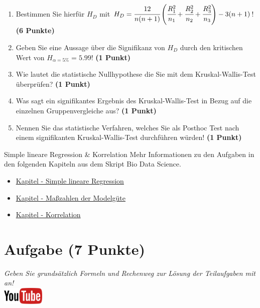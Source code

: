 \documentclass[a4paper, 9pt]{scrartcl}\usepackage[]{graphicx}\usepackage[]{xcolor}
\begin{document}
\begin{enumerate}
\item Bestimmen Sie hierf{\"u}r $H_D$ mit $H_D=
  \cfrac{12}{n(n+1)}\left(\cfrac{R_1^2}{n_1}+\cfrac{R_2^2}{n_2}
    + \cfrac{R_3^2}{n_3}\right)
  - 3(n+1)$! \textbf{(6 Punkte)} 
\item Geben Sie eine Aussage {\"u}ber die Signifikanz von $H_D$ durch
  den kritischen Wert von $H_{\alpha = 5\%} = 5.99$! \textbf{(1 Punkt)}
\item Wie lautet die statistische Nullhypothese die Sie mit dem Kruskal-Wallis-Test
  {\"u}berpr{\"u}fen? \textbf{(1 Punkt)}
\item Was sagt ein signifikantes Ergebnis des Kruskal-Wallis-Test in Bezug
  auf die einzelnen Gruppenvergleiche aus? \textbf{(1 Punkt)}
\item Nennen Sie das statistische Verfahren, welches Sie als Posthoc Test
  nach einem signifikanten Kruskal-Wallis-Test durchf{\"u}hren w{\"u}rden! \textbf{(1 Punkt)}
\end{enumerate} 
\clearpage
\begin{graybox}{Simple lineare Regression \& Korrelation}
Mehr Informationen zu den Aufgaben in den folgenden Kapiteln aus dem Skript Bio Data Science.
  \begin{itemize}
  \item \href{https://jkruppa.github.io/stat-linear-reg-basic.html}{Kapitel - Simple lineare Regression}
  \item \href{https://jkruppa.github.io/stat-linear-reg-quality.html}{Kapitel - Ma{\ss}zahlen der Modelgüte}
  \item \href{https://jkruppa.github.io/stat-linear-reg-corr.html}{Kapitel - Korrelation}
  \end{itemize}
\end{graybox}
\clearpage

\section{Aufgabe \hfill (7 Punkte)}

\textit{Geben Sie grunds{\"a}tzlich Formeln und Rechenweg zur L{\"o}sung der
  Teilaufgaben mit an!} \\[1Ex]

\hfill\href{https://youtu.be/2dUJcYK9RgU}{\includegraphics[width =
  2cm]{img/youtube}}\\[1Ex]
\end{document}
